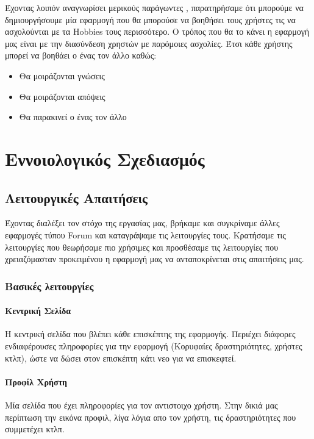 \documentclass[acmtog, nonacm, language=english, language=greek]{acmart}
\newcommand{\en}[1]{\textlatin{#1}}
\begin{document}
Έχοντας λοιπόν αναγνωρίσει μερικούς παράγωντες , παρατηρήσαμε ότι μπορούμε να δημιουργήσουμε μία εφαρμογή που θα μπορούσε να βοηθήσει τους χρήστες τις να ασχολούνται με τα \en{Hobbies} τους περισσότερο.
Ο τρόπος που θα το κάνει η εφαρμογή μας είναι με την διασύνδεση χρηστών με παρόμοιες ασχολίες.
Έτσι κάθε χρήστης μπορεί να βοηθάει ο ένας τον άλλο καθώς:
\begin{itemize}
    \item Θα μοιράζονται γνώσεις
    \item Θα μοιράζονται απόψεις
    \item Θα παρακινεί ο ένας τον άλλο
\end{itemize}

\section{Εννοιολογικός Σχεδιασμός}

\subsection{Λειτουργικές Απαιτήσεις}

Έχοντας διαλέξει τον στόχο της εργασίας μας, βρήκαμε και συγκρίναμε άλλες εφαρμογές τύπου \en{Forum} και καταγράψαμε τις λειτουργίες τους.
Κρατήσαμε τις λειτουργίες που θεωρήσαμε πιο χρήσιμες και προσθέσαμε τις λειτουργίες που χρειαζόμασταν προκειμένου η εφαρμογή μας να ανταποκρίνεται στις απαιτήσεις μας.

\subsubsection{Βασικές λειτουργίες}

\paragraph{Κεντρική Σελίδα} Η κεντρική σελίδα που βλέπει κάθε επισκέπτης της εφαρμογής. Περιέχει διάφορες ενδιαφέρουσες πληροφορίες για την εφαρμογή (Κορυφαίες δραστηριότητες, χρήστες κτλπ), ώστε να δώσει στον επισκέπτη κάτι νεο για να επισκεφτεί.
 
\paragraph{Προφίλ Χρήστη} Μία σελίδα που έχει πληροφορίες για τον αντιστοιχο χρήστη. Στην δικιά μας περίπτωση την εικόνα προφιλ, λίγα λόγια απο τον χρήστη, τις δραστηριότητες που συμμετέχει κτλπ.
 
\end{document}
